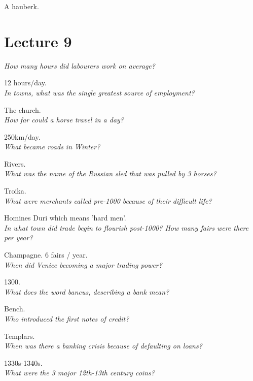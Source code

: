 \documentclass[12pt]{article}
\begin{document}
A hauberk.\\

\section*{Lecture 9}

\textit{How many hours did labourers work on average?}

12 hours/day.\\

\textit{In towns, what was the single greatest source of employment?}

The church.\\

\textit{How far could a horse travel in a day?}

250km/day.\\

\textit{What became roads in Winter?}

Rivers.\\

\textit{What was the name of the Russian sled that was pulled by 3 horses?}

Troika.\\

\textit{What were merchants called pre-1000 because of their difficult life?}

Homines Duri which means 'hard men'.\\

\textit{In what town did trade begin to flourish post-1000? How many fairs were there per year?}

Champagne. 6 fairs / year.\\

\textit{When did Venice becoming a major trading power?}

1300.\\

\textit{What does the word bancus, describing a bank mean?}

Bench.\\

\textit{Who introduced the first notes of credit?}

Templars.\\

\textit{When was there a banking crisis because of defaulting on loans?}

1330s-1340s.\\

\textit{What were the 3 major 12th-13th century coins?}
\end{document}
